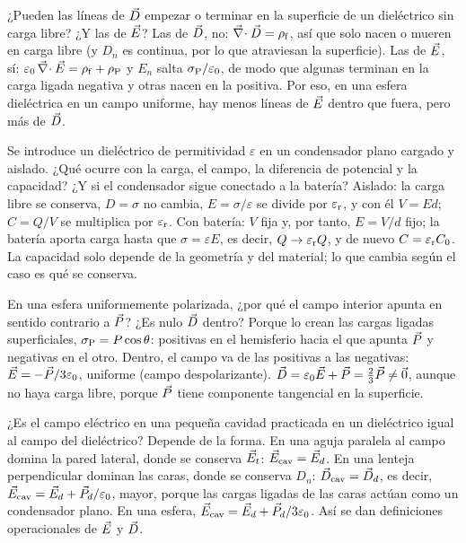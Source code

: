\begin{pregunta}{¿Pueden las líneas de $\vec D$ empezar o terminar en la superficie de un dieléctrico sin carga libre? ¿Y las de $\vec E$?}
Las de $\vec D$, no: $\vec\nabla\!\cdot\vec D=\rho_{\mathrm f}$, así que solo nacen o mueren en carga libre (y $D_n$ es continua, por lo que atraviesan la superficie). Las de $\vec E$,
sí: $\varepsilon_0\,\vec\nabla\!\cdot\vec E=\rho_{\mathrm f}+\rho_{\mathrm P}$ y $E_n$ salta $\sigma_{\mathrm P}/\varepsilon_0$, de modo que algunas terminan en la carga ligada negativa y otras nacen en la positiva.
Por eso, en una esfera dieléctrica en un campo uniforme, hay menos líneas de $\vec E$ dentro que fuera, pero más de $\vec D$.
\end{pregunta}

\begin{pregunta}{Se introduce un dieléctrico de permitividad $\varepsilon$ en un condensador plano cargado y aislado. ¿Qué ocurre con la carga, el campo, la diferencia de potencial y la capacidad? ¿Y si el condensador sigue conectado a la batería?}
Aislado: la carga libre se conserva, $D=\sigma$ no cambia, $E=\sigma/\varepsilon$ se divide por $\varepsilon_{\mathrm r}$, y con él $V=Ed$; $C=Q/V$ se multiplica por $\varepsilon_{\mathrm r}$.
Con batería: $V$ fija y, por tanto, $E=V/d$ fijo; la batería aporta carga hasta que $\sigma=\varepsilon E$, es decir, $Q\to\varepsilon_{\mathrm r} Q$, y de nuevo $C=\varepsilon_{\mathrm r} C_0$.
La capacidad solo depende de la geometría y del material; lo que cambia según el caso es qué se conserva.
\end{pregunta}

\begin{pregunta}{En una esfera uniformemente polarizada, ¿por qué el campo interior apunta en sentido contrario a $\vec P$? ¿Es nulo $\vec D$ dentro?}
Porque lo crean las cargas ligadas superficiales, $\sigma_{\mathrm P}=P\cos\theta$: positivas en el hemisferio hacia el que apunta $\vec P$ y negativas en el
otro. Dentro, el campo va de las positivas a las negativas: $\vec E=-\vec P/3\varepsilon_0$, uniforme (campo despolarizante). $\vec D=\varepsilon_0\vec E+\vec P=\tfrac23\vec P\neq\vec 0$,
aunque no haya carga libre, porque $\vec P$ tiene componente tangencial en la superficie.
\end{pregunta}

\begin{pregunta}{¿Es el campo eléctrico en una pequeña cavidad practicada en un dieléctrico igual al campo del dieléctrico?}
Depende de la forma. En una aguja paralela al campo domina la pared lateral, donde se conserva $\vec E_t$: $\vec E_{\mathrm{cav}}=\vec E_d$. En una lenteja
perpendicular dominan las caras, donde se conserva $D_n$: $\vec D_{\mathrm{cav}}=\vec D_d$, es decir, $\vec E_{\mathrm{cav}}=\vec E_d+\vec P_d/\varepsilon_0$, mayor, porque las cargas ligadas de
las caras actúan como un condensador plano. En una esfera, $\vec E_{\mathrm{cav}}=\vec E_d+\vec P_d/3\varepsilon_0$. Así se dan definiciones operacionales de $\vec E$ y $\vec D$.
\end{pregunta}

